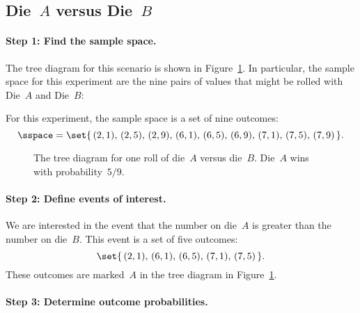 \subsection{Die~$A$ versus Die~$B$}

\paragraph{Step 1: Find the sample space.}

The tree diagram for this scenario is shown in Figure~\ref{fig:14A8}.
In particular, the sample space for this experiment are the nine pairs
of values that might be rolled with Die~$A$ and Die~$B$:

For this experiment, the sample space is a set of nine outcomes:
\begin{equation*}
\sspace = \set{\, (2, 1), \, (2, 5), \, (2, 9), \,
                  (6, 1), \, (6, 5), \, (6, 9), \,
                  (7, 1), \, (7, 5), \, (7, 9) \,}.
\end{equation*}


\iffalse
\footnote{Actually, the whole
  probability space is worked out in this one picture.  But pretend
  that each component sort of fades in---nyyrrroom!---as you read
  about the corresponding step below.}\fi

\begin{figure}


\caption{The tree diagram for one roll of die~$A$ versus die~$B$.
  Die~$A$ wins with probability~$5/9$.}

\label{fig:14A8}

\end{figure}


\paragraph{Step 2: Define events of interest.}

We are interested in the event that the number on die~$A$ is greater
than the number on die~$B$.  This event is a set of five outcomes:
\begin{equation*}
    \set{\, (2, 1), \, (6, 1), \, (6, 5), \, (7, 1), \, (7, 5) \,}.
\end{equation*}
These outcomes are marked~$A$ in the tree diagram in
Figure~\ref{fig:14A8}.

\paragraph{Step 3: Determine outcome probabilities.}

